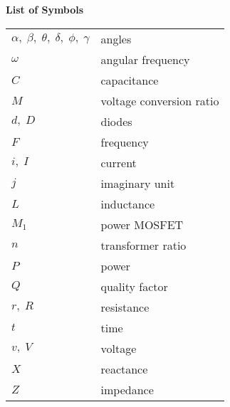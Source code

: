 

\newpage
{}


\begin{flushleft}
\Huge \textbf{List of Symbols}
\bigskip
\bigskip
\end{flushleft}


\begin{tabular}{ll}

$\alpha,\;\beta,\;\theta,\;\delta,\;\phi,\;\gamma$ & angles\\

$\omega$ & angular frequency\\

$C$ & capacitance\\

$M$ &  voltage conversion ratio\\

$d,\;D$ & diodes\\

$F$ & frequency\\

$i,\;I$ & current\\

$j$ & imaginary unit\\

$L$ & inductance\\

$M_1$ & power MOSFET\\

$n$ & transformer ratio\\


$P$ & power\\

$Q$ & quality factor\\

$r,\;R$ & resistance\\


$t$ & time\\

$v,\; V$ & voltage\\

$X$ & reactance \\

$Z$ & impedance\\


\end{tabular}
